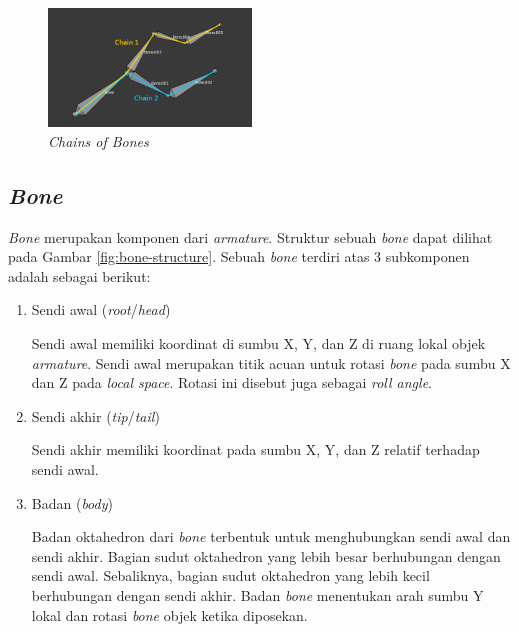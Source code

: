 \begin{figure}[ht]
    \centering
    \includegraphics[width=0.48\textwidth]{resources/chapter-2-chain-of-bones.png}
    \caption{\textit{Chains of Bones} \parencite{blender-manual}}
    \label{fig:chains-of-bones}
\end{figure}

\subsection{\textit{Bone}}

\textit{Bone} merupakan komponen dari \textit{armature}. Struktur sebuah
\textit{bone} dapat dilihat pada Gambar \ref{fig:bone-structure}. Sebuah
\textit{bone} terdiri atas 3 subkomponen adalah sebagai berikut:

\begin{enumerate}

    \item Sendi awal (\textit{root}/\textit{head})

    Sendi awal memiliki koordinat di sumbu X, Y, dan Z di ruang lokal objek
    \textit{armature}. Sendi awal merupakan titik acuan untuk rotasi
    \textit{bone} pada sumbu X dan Z pada \textit{local space}. Rotasi ini
    disebut juga sebagai \textit{roll angle}.

    \item Sendi akhir (\textit{tip}/\textit{tail})

    Sendi akhir memiliki koordinat pada sumbu X, Y, dan Z relatif terhadap sendi
    awal.

    \item Badan (\textit{body})

    Badan oktahedron dari \textit{bone} terbentuk untuk menghubungkan sendi awal
    dan sendi akhir. Bagian sudut oktahedron yang lebih besar berhubungan dengan
    sendi awal. Sebaliknya, bagian sudut oktahedron yang lebih kecil berhubungan
    dengan sendi akhir. Badan \textit{bone} menentukan arah sumbu Y lokal dan
    rotasi \textit{bone} objek ketika diposekan.

\end{enumerate}

